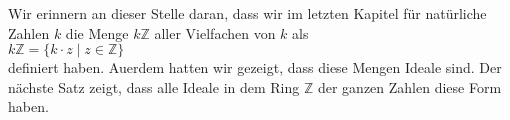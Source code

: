 

Wir erinnern an dieser Stelle daran, dass wir im letzten Kapitel f\"{u}r nat\"{u}rliche Zahlen $k$
die Menge $k\mathbb{Z}$ aller Vielfachen von $k$ als
\\[0.2cm]
\hspace*{1.3cm}
$k\mathbb{Z} = \{ k \cdot z \mid z \in \mathbb{Z} \}$
\\[0.2cm]
definiert haben.  Au\3erdem hatten wir gezeigt, dass diese Mengen Ideale sind.
Der n\"{a}chste Satz zeigt, dass alle Ideale in dem Ring $\mathbb{Z}$ der ganzen Zahlen
diese Form haben.

